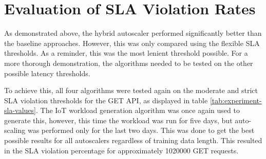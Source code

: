 \section{Evaluation of SLA Violation Rates}
\label{sec:ch6-sla-violation-eval}

As demonstrated above, the hybrid autoscaler performed significantly better than the baseline approaches. However, this was only compared using the flexible SLA thresholds. As a reminder, this was the most lenient threshold possible. For a more thorough demonstration, the algorithms needed to be tested on the other possible latency thresholds.\par

To achieve this, all four algorithms were tested again on the moderate and strict SLA violation thresholds for the GET API, as displayed in table \ref{tab:experiment-sla-values}. The IoT workload generation algorithm was once again used to generate this, however, this time the workload was run for five days, but auto-scaling was performed only for the last two days. This was done to get the best possible results for all autoscalers regardless of training data length. This resulted in the SLA violation percentage for approximately \num[group-separator={,}]{1020000} GET requests.\par

